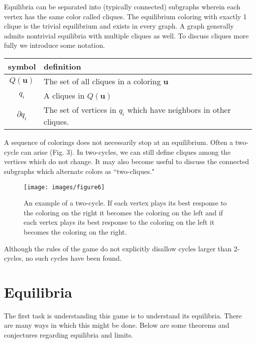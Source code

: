 \documentclass[]{article}
\begin{document}
Equilibria can be separated into (typically connected) subgraphs wherein each vertex has the same color called cliques. The equilibrium coloring with exactly 1 clique is the trivial equilibrium and exists in every graph. A graph generally admits nontrivial equilibria with multiple cliques as well. To discuss cliques more fully we introduce some notation.
\begin{center}
	\begin{tabular}{c|l}
		symbol&definition\\
		\hline
		$Q(\mathbf{u})$& The set of all cliques in a coloring $\mathbf{u}$\\
		$q_i$& A cliques in $Q(\mathbf{u})$\\
		$\partial q_i$ &The set of vertices in $q_i$ which have neighbors in other cliques. 	
	\end{tabular}
\end{center}

 A sequence of colorings does not necessarily stop at an equilibrium. Often a two-cycle can arise (Fig. 3). In two-cycles, we can still define cliques among the vertices which do not change. It may also become useful to discuss the connected subgraphs which alternate colors as ``two-cliques."

\begin{figure}[h!]
	\texttt{[image: images/figure6]}
	\caption{An example of a two-cycle. If each vertex plays its best response to the coloring on the right it becomes the coloring on the left and if each vertex plays its best response to the coloring on the left it becomes the coloring on the right. }
\end{figure}

Although the rules of the game do not explicitly disallow cycles larger than 2-cycles, no such cycles have been found. 

\section{Equilibria}
The first task is understanding this game is to understand its equilibria. There are many ways in which this might be done. Below are some theorems and conjectures regarding equilibria and limits. 
\end{document}

